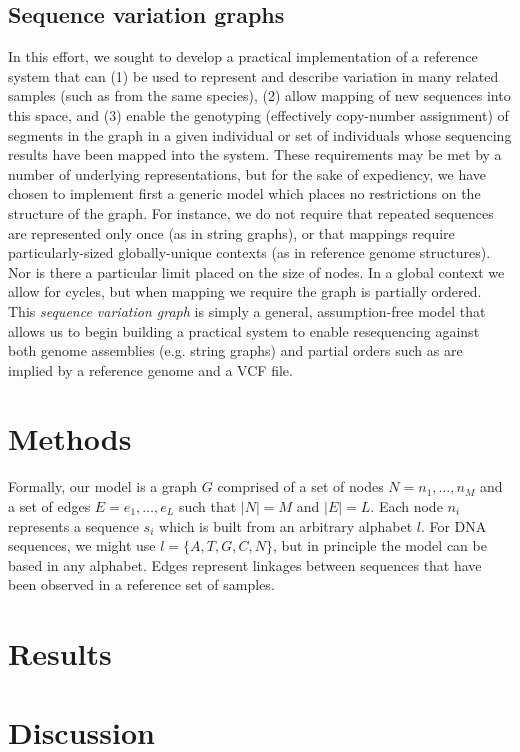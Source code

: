 \documentclass{article}
\begin{document}
\subsection{Sequence variation graphs}

In this effort, we sought to develop a practical implementation of a reference system that can (1) be used to represent and describe variation in many related samples (such as from the same species), (2) allow mapping of new sequences into this space, and (3) enable the genotyping (effectively copy-number assignment) of segments in the graph in a given individual or set of individuals whose sequencing results have been mapped into the system. These requirements may be met by a number of underlying representations, but for the sake of expediency, we have chosen to implement first a generic model which places no restrictions on the structure of the graph. For instance, we do not require that repeated sequences are represented only once (as in string graphs), or that mappings require particularly-sized globally-unique contexts (as in reference genome structures). Nor is there a particular limit placed on the size of nodes. In a global context we allow for cycles, but when mapping we require the graph is partially ordered. This \emph{sequence variation graph} is simply a general, assumption-free model that allows us to begin building a practical system to enable resequencing against both genome assemblies (e.g. string graphs) and partial orders such as are implied by a reference genome and a VCF file.

\section{Methods}

Formally, our model is a graph $G$ comprised of a set of nodes $N = n_1, \ldots ,n_M$ and a set of edges $E = e_1, \ldots, e_L$ such that $|N| = M$ and $|E| = L$. Each node $n_i$ represents a sequence $s_i$ which is built from an arbitrary alphabet $l$. For DNA sequences, we might use $l = \{ A, T, G, C, N \}$, but in principle the model can be based in any alphabet. Edges represent linkages between sequences that have been observed in a reference set of samples.



\section{Results}

\section{Discussion}

{}


\end{document}
